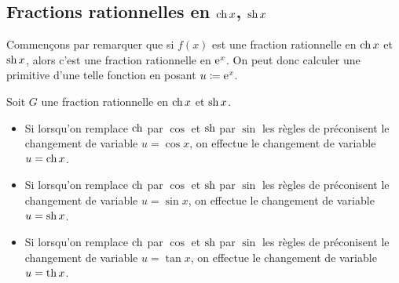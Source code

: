 \documentclass{magnolia}
\begin{document}

\subsection{Fractions rationnelles en $\operatorname{ch} x$, $\operatorname{sh} x$}

Commençons par remarquer que si $f(x)$ est une fraction rationnelle en $\operatorname{ch} x$ et $\operatorname{sh} x$,
alors c'est une fraction rationnelle en ${\rm e}^x$. On peut donc calculer une primitive
d'une telle fonction en posant $u\coloneqq{\rm e}^x$.

\begin{proposition}
Soit $G$ une fraction rationnelle en $\operatorname{ch} x$ et $\operatorname{sh} x$.
\begin{itemize}
\item Si lorsqu'on remplace $\operatorname{ch}$ par $\cos$ et $\operatorname{sh}$ par $\sin$ les règles de
   préconisent le changement de variable $u=\cos x$, on effectue le
  changement de variable $u=\operatorname{ch} x$. 
\item Si lorsqu'on remplace $\operatorname{ch}$ par $\cos$ et $\operatorname{sh}$ par $\sin$ les règles de
   préconisent le changement de variable $u=\sin x$, on effectue le
  changement de variable $u=\operatorname{sh} x$. 
\item Si lorsqu'on remplace $\operatorname{ch}$ par $\cos$ et $\operatorname{sh}$ par $\sin$ les règles de
   préconisent le changement de variable $u=\tan x$, on effectue le
  changement de variable $u=\operatorname{th} x$. 
\end{itemize}
\end{proposition}
\end{document}
